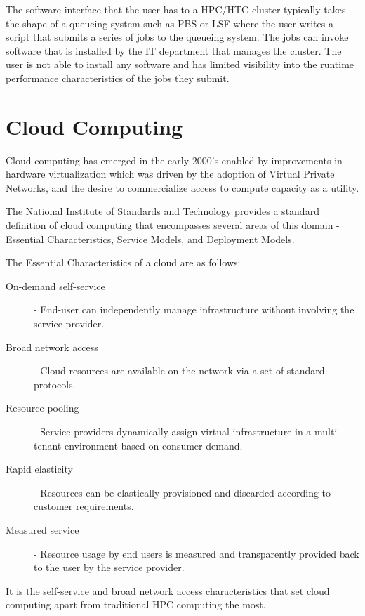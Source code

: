 The software interface that the user has to a HPC/HTC cluster typically takes the shape of a queueing system such as PBS\autocite{henderson1995job} or LSF\autocite{zhou1992lsf}  where the user writes a script that submits a series of jobs to the queueing system. The jobs can invoke software that is installed by the IT department that manages the cluster. The user is not able to install any software and has limited visibility into the runtime performance characteristics of the jobs they submit. 

\section{Cloud Computing}

Cloud computing has emerged in the early 2000's enabled by improvements in hardware virtualization which was driven by the adoption of Virtual Private Networks, and the desire to commercialize access to compute capacity as a utility\autocite{buyya2009cloud}.

The National Institute of Standards and Technology provides a standard definition of cloud computing that encompasses several areas of this domain - Essential Characteristics, Service Models, and Deployment Models\autocite{mell2011nist}.

The Essential Characteristics of a cloud are as follows:

\begin{description}
\item [On-demand self-service] - End-user can independently manage infrastructure without involving the service provider.
\item [Broad network access] - Cloud resources are available on the network via a set of standard protocols.
\item [Resource pooling] - Service providers dynamically assign virtual infrastructure in a multi-tenant environment based on consumer demand.
\item [Rapid elasticity] - Resources can be elastically provisioned and discarded according to customer requirements.
\item [Measured service] - Resource usage by end users is measured and transparently provided back to the user by the service provider.
\end{description}

It is the self-service and broad network access characteristics that set cloud computing apart from traditional HPC computing the most.

